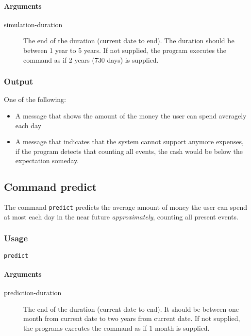 \paragraph{Arguments}
\begin{description}
	\item[simulation-duration] The end of the duration (current date to end). The duration should be between 1 year to 5 years. If not supplied, the program executes the command as if 2 years (730 days) is supplied.
\end{description}

\subsubsection{Output}
One of the following:
\begin{itemize}
	\item A message that shows the amount of the money the user can spend averagely each day
	\item A message that indicates that the system cannot support anymore expenses, if the program detects that counting all events, the cash would be below the expectation someday.
\end{itemize}

\subsection{Command predict}
The command \texttt{predict} predicts the average amount of money the user can spend at most each day in the near future \emph{approximately}, counting all present events.
\subsubsection{Usage}
\begin{center}
	\texttt{predict} 
\end{center}

\paragraph{Arguments}
\begin{description}
	\item[prediction-duration] The end of the duration (current date to end). It should be between one month from current date to two years from current date. If not supplied, the programs executes the command as if 1 month is supplied.
\end{description}

